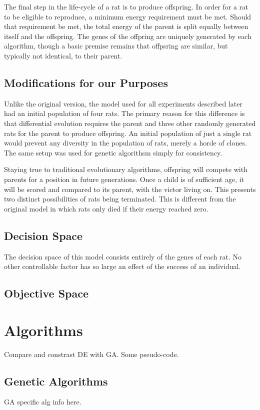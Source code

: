 \documentclass{sig-alternate}
\begin{document}
The final step in the life-cycle of a rat is to produce offspring.  In order for a rat to be eligible to reproduce, a minimum energy requirement must be met.  Should that requirement be met, the total energy of the parent is split equally between itself and the offspring.  The genes of the offpring are uniquely generated by each algorithm, though a basic premise remains that offpsring are similar, but typically not identical, to their parent.

\subsection{Modifications for our Purposes}
Unlike the original version, the model used for all experiments described later had an initial population of four rats.  The primary reason for this difference is that differential evolution requires the parent and three other randomly generated rats for the parent to produce offspring.  An initial population of just a single rat would prevent any diversity in the population of rats, merely a horde of clones.  The same setup was used for genetic algorithsm simply for consistency.

Staying true to traditional evolutionary algorithms, offspring will compete with parents for a position in future generations.  Once a child is of sufficient age, it will be scored and compared to its parent, with the victor living on.  This presents two distinct possibilities of rats being terminated.  This is different from the original model in which rats only died if their energy reached zero.  

\subsection{Decision Space}
The decision space of this model consists entirely of the genes of each rat.  No other controllable factor has so large an effect of the success of an individual.  

\subsection{Objective Space}


\section{Algorithms}
Compare and constrast DE with GA.  Some pseudo-code.

\subsection{Genetic Algorithms}
GA specific alg info here.
\end{document}

